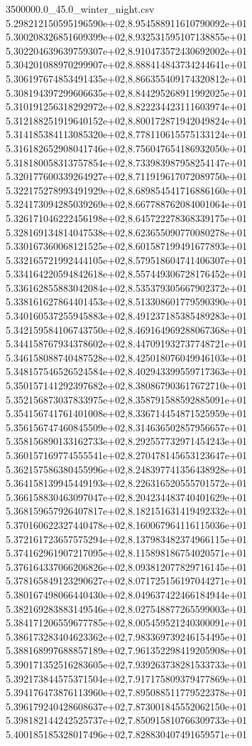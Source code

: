 \begin{filecontents*}{3500000.0_45.0_winter_night.csv}
5.298212150595196590e+02,8.954588911610790092e+01
5.300208326851609399e+02,8.932531595107138855e+01
5.302204639639759307e+02,8.910473572430692002e+01
5.304201088970299907e+02,8.888414843734244641e+01
5.306197674853491435e+02,8.866355409174320812e+01
5.308194397299606635e+02,8.844295268911992025e+01
5.310191256318292972e+02,8.822234423111603974e+01
5.312188251919640152e+02,8.800172871942049824e+01
5.314185384113085320e+02,8.778110615575133124e+01
5.316182652908041746e+02,8.756047654186932050e+01
5.318180058313757854e+02,8.733983987958254147e+01
5.320177600339264927e+02,8.711919617072089750e+01
5.322175278993491929e+02,8.689854541716886160e+01
5.324173094285039269e+02,8.667788762084001064e+01
5.326171046222456198e+02,8.645722278368339175e+01
5.328169134814047538e+02,8.623655090770080278e+01
5.330167360068121525e+02,8.601587199491677893e+01
5.332165721992444105e+02,8.579518604741406307e+01
5.334164220594842618e+02,8.557449306728176452e+01
5.336162855883042084e+02,8.535379305667902372e+01
5.338161627864401453e+02,8.513308601779590390e+01
5.340160537255945883e+02,8.491237185385489283e+01
5.342159584106743750e+02,8.469164969288067368e+01
5.344158767934378602e+02,8.447091932737748721e+01
5.346158088740487528e+02,8.425018076049946103e+01
5.348157546526524584e+02,8.402943399559717363e+01
5.350157141292397682e+02,8.380867903617672710e+01
5.352156873037833975e+02,8.358791588592885091e+01
5.354156741761401008e+02,8.336714454871525959e+01
5.356156747460845509e+02,8.314636502857956657e+01
5.358156890133162733e+02,8.292557732971454243e+01
5.360157169774555541e+02,8.270478145653123647e+01
5.362157586380455996e+02,8.248397741356438928e+01
5.364158139945449193e+02,8.226316520555701572e+01
5.366158830463097047e+02,8.204234483740401629e+01
5.368159657926407817e+02,8.182151631419492332e+01
5.370160622327440478e+02,8.160067964116115036e+01
5.372161723657575294e+02,8.137983482374966115e+01
5.374162961907217095e+02,8.115898186754020571e+01
5.376164337066206826e+02,8.093812077829716145e+01
5.378165849123290627e+02,8.071725156197044271e+01
5.380167498066440430e+02,8.049637422466184944e+01
5.382169283883149546e+02,8.027548877265599003e+01
5.384171206559677785e+02,8.005459521240300091e+01
5.386173283404623362e+02,7.983369739246154495e+01
5.388168997688857189e+02,7.961352298419205908e+01
5.390171352516283605e+02,7.939263738281533733e+01
5.392173844575371504e+02,7.917175809379477869e+01
5.394176473876113960e+02,7.895088511779522378e+01
5.396179240428608637e+02,7.873001845552062150e+01
5.398182144242525737e+02,7.850915810766309733e+01
5.400185185328017496e+02,7.828830407491659571e+01

\end{filecontents*}

